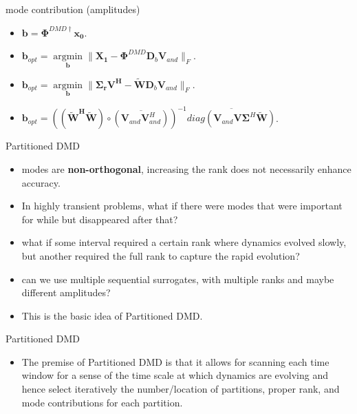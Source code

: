 \documentclass[fleqn]{beamer}
\DeclareMathOperator*{\argmin}{argmin}
\renewcommand{\vec}[1]{\bm{#1}} %
\begin{document}
\begin{frame}
\begin{block}{mode contribution (amplitudes)}
\begin{itemize}
\item$\vec{b}=\boldsymbol{\Phi}^{DMD\dagger}\vec{x_0}.$
\item $\vec{b}_{opt}=\argmin\limits_{\vec{b}}\|\mathbf{X_{1}} -\boldsymbol{\Phi}^{DMD}\mathbf{D}_b\mathbf{V}_{and}\|_F $.
\item$\vec{b}_{opt}=\argmin\limits_{\vec{b}}\|\boldsymbol{\Sigma_r}\mathbf{V^{H}} -\mathbf{\tilde{W}}\mathbf{D}_b\mathbf{V}_{and}\|_F.$
\item $\vec{b}_{opt}=\left( (\mathbf{\tilde{W}^H}\mathbf\tilde{{W}})\circ( \overline{\mathbf{V}_{and}\mathbf{V}_{and}^{H}})\right)^{-1}\overline{diag(\mathbf{V}_{and}\mathbf{V}\boldsymbol{\Sigma}^{H}\mathbf{\tilde{W}})}$.
\end{itemize}
\end{block}
\end{frame}

\begin{frame}
\begin{block}{Partitioned DMD}
\begin{itemize}
\item modes are \textbf{non-orthogonal}, increasing the rank does not necessarily enhance accuracy. 
\item In highly transient problems, what if there were modes that were important for while but disappeared after that?
\item what if some interval required a certain rank where dynamics evolved slowly, but another required the full rank to capture the rapid evolution?
\item can we use multiple sequential surrogates, with multiple ranks and maybe different amplitudes?
\item This is the basic idea of Partitioned DMD.
\end{itemize}
\end{block}
\end{frame}

\begin{frame}
\begin{block}{Partitioned DMD}
\begin{itemize}
\item  The premise of Partitioned DMD is that it allows for scanning each time window for a sense of the time scale at which dynamics are evolving and hence select iteratively the number/location of partitions, proper rank, and mode contributions for each partition.  
\end{itemize}
\end{block}
\end{frame}
\end{document}
